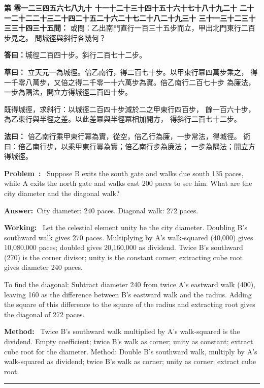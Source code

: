 \documentclass[9pt,a4paper]{article}
\newcounter{probnum}
\newcounter{overallnum}
\newcommand{\chnum}[1]{%
  \ifcase#1 零\or 一\or 二\or 三\or 四\or 五\or 六\or 七\or 八\or 九\or 十\or
    十一\or 十二\or 十三\or 十四\or 十五\or 十六\or 十七\or 十八\or 十九\or 二十\or
    二十一\or 二十二\or 二十三\or 二十四\or 二十五\or 二十六\or 二十七\or 二十八\or 二十九\or 三十\or
    三十一\or 三十二\or 三十三\or 三十四\or 三十五\fi}
\newcommand{\problem}[1]{\stepcounter{probnum}\stepcounter{overallnum}\par\noindent\textbf{\color{volcolor}第\chnum{\value{probnum}}問：}#1\par\vspace{0.15cm}}
\newcommand{\answer}[1]{\par\noindent\textbf{答曰：}#1\par\vspace{0.15cm}}
\newcommand{\working}[1]{\par\noindent\textbf{草曰：}#1\par\vspace{0.15cm}}
\newcommand{\method}[1]{\par\noindent\textbf{法曰：}#1\par\vspace{0.25cm}}
\newcommand{\eproblem}[1]{\par\noindent\textbf{\color{volcolor}Problem~\theoverallnum:}~#1\par\vspace{0.15cm}}
\newcommand{\eanswer}[1]{\par\noindent\textbf{Answer:}~#1\par\vspace{0.15cm}}
\newcommand{\eworking}[1]{\par\noindent\textbf{Working:}~#1\par\vspace{0.15cm}}
\newcommand{\emethod}[1]{\par\noindent\textbf{Method:}~#1\par\vspace{0.25cm}}
\begin{document}
\noindent\begin{minipage}[t]{0.48\textwidth}
\problem{
或問：乙出南門直行一百三十五步而立，甲出北門東行二百步見之。
問城徑與斜行各幾何？
}

\answer{城徑二百四十步。斜行二百七十二步。}

\working{
立天元一為城徑。倍乙南行，得二百七十步。以甲東行冪四萬步乘之，
得一千零八萬步，又倍之得二千零一十六萬步為實。倍乙南行二百七十步
為廉法，一步為隅法，開立方得城徑二百四十步。

既得城徑，求斜行：以城徑二百四十步減於二之甲東行四百步，
餘一百六十步，為乙東行與半徑之差。以此差冪與半徑冪相加開方，
得斜行二百七十二步。
}

\method{
倍乙南行乘甲東行冪為實，從空，倍乙行為廉，一步常法，得城徑。
術曰：倍乙南行步，以乘甲東行冪為實；倍乙南行步為廉法；
一步為隅法；開立方得城徑。
}
\end{minipage}%
\hfill%
\begin{minipage}[t]{0.50\textwidth}
\eproblem{
Suppose B exits the south gate and walks due south 135 paces, while A exits
the north gate and walks east 200 paces to see him. What are the city diameter
and the diagonal walk?
}

\eanswer{City diameter: 240 paces. Diagonal walk: 272 paces.}

\eworking{
Let the celestial element unity be the city diameter. Doubling B's southward
walk gives 270 paces. Multiplying by A's walk-squared (40,000) gives
10,080,000 paces; doubled gives 20,160,000 as dividend. Twice B's southward
(270) is the corner divisor; unity is the constant corner; extracting cube
root gives diameter 240 paces.

To find the diagonal: Subtract diameter 240 from twice A's eastward walk
(400), leaving 160 as the difference between B's eastward walk and the radius.
Adding the square of this difference to the square of the radius and extracting
root gives the diagonal of 272 paces.
}

\emethod{
Twice B's southward walk multiplied by A's walk-squared is the dividend.
Empty coefficient; twice B's walk as corner; unity as constant;
extract cube root for the diameter. Method: Double B's southward walk,
multiply by A's walk-squared as dividend; twice B's walk as corner;
unity as corner; extract cube root.
}
\end{minipage}
\vspace{0.15cm}

\vspace{0.15cm}
\noindent\rule{\textwidth}{0.2pt}
\vspace{0.15cm}
\end{document}
